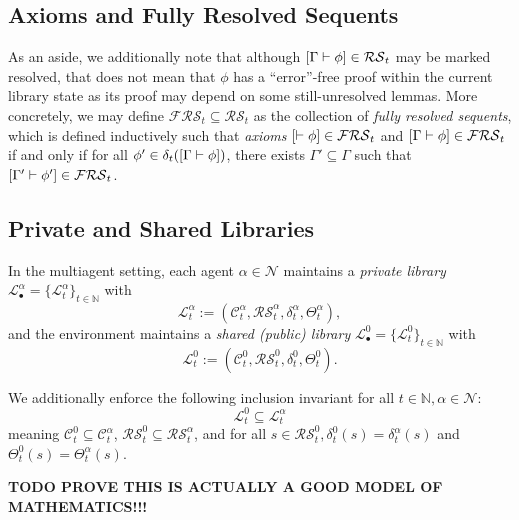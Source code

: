 \subsection{Axioms and Fully Resolved Sequents}

As an aside, we additionally note that although $[\Gamma \vdash \phi] \in \mathcal{RS}_t$ may be marked resolved, that does not mean that $\phi$ has a ``error''-free proof within the current library state as its proof may depend on some still-unresolved lemmas. More concretely, we may define $\mathcal{FRS}_t \subseteq \mathcal{RS}_t$ as the collection of \textit{fully resolved sequents}, which is defined inductively such that \textit{axioms} $[\vdash \phi] \in \mathcal{FRS}_t$ and $[\Gamma \vdash \phi] \in \mathcal{FRS}_t$ if and only if for all $\phi' \in \delta_t([\Gamma \vdash \phi])$, there exists $\Gamma'\subseteq \Gamma$ such that $[\Gamma' \vdash \phi'] \in \mathcal{FRS}_t$.


\subsection{Private and Shared Libraries}
In the multiagent setting, each agent $\alpha\in\mathcal{N}$ maintains a \textit{private library} $\mathcal{L}_\bullet^\alpha = \{\mathcal{L}^\alpha_t\}_{t\in\mathbb{N}}$ with
\[
\mathcal{L}^\alpha_t := (\mathcal{C}^\alpha_t,\mathcal{RS}^\alpha_t,\delta^\alpha_t,\Theta_t^\alpha),
\]
and the environment maintains a \textit{shared (public) library} $\mathcal{L}_\bullet^0 = \{\mathcal{L}^0_t\}_{t\in\mathbb{N}}$ with
\[
\mathcal{L}^0_t := (\mathcal{C}^0_t,\mathcal{RS}^0_t,\delta^0_t, \Theta_t^0).
\]

We additionally enforce the following inclusion invariant for all $t \in \mathbb{N}, \alpha \in \mathcal{N}$:
\[
\mathcal{L}^0_t \subseteq \mathcal{L}^\alpha_t
\]
meaning $\mathcal{C}^0_t\subseteq \mathcal{C}^\alpha_t$, $\mathcal{RS}^0_t\subseteq \mathcal{RS}^\alpha_t$, and for all $s\in \mathcal{RS}_t^0, \delta^0_t(s) = \delta^\alpha_t(s)$ and $\Theta^0_t(s)=\Theta^\alpha_t(s)$.




\textbf{TODO PROVE THIS IS ACTUALLY A GOOD MODEL OF MATHEMATICS!!!}